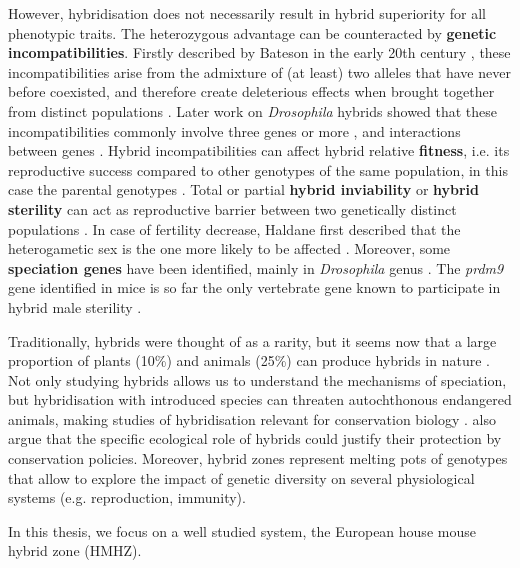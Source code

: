 However, hybridisation does not necessarily result in hybrid superiority for all phenotypic traits. The heterozygous advantage can be counteracted by \textbf{genetic incompatibilities}. Firstly described by Bateson in the early 20th century \citep{bateson_heredity_1909}, these incompatibilities arise from the admixture of (at least) two alleles that have never before coexisted, and therefore create deleterious effects when brought together from distinct populations \citep{dobzhansky_studies_1936, muller_isolating_1942, orr_population_1995}. Later work on \textit{Drosophila} hybrids showed that these incompatibilities commonly involve three genes or more \citep{cabot_genetics_1994, palopoli_genetics_1994}, and interactions between genes \parencite[\textbf{negative epistasis};][]{larson_evolution_2018}. Hybrid incompatibilities can affect hybrid relative \textbf{fitness}, i.e. its reproductive success compared to other genotypes of the same population, in this case the parental genotypes \citep{krimbas_fitness_2001}. Total or partial \textbf{hybrid inviability} or \textbf{hybrid sterility} can act as reproductive barrier between two genetically distinct populations \citep{coyne_reproductive_2001}. In case of fertility decrease, Haldane first described that the heterogametic sex is the one more likely to be affected \citep{haldane_sex_1922}. Moreover, some \textbf{speciation genes} \parencite[genes underlying reproductive isolation;][]{wu_genes_2004} have been identified, mainly in \textit{Drosophila} genus \citep{oliver_accelerated_2009}. The \textit{prdm9} gene identified in mice is so far the only vertebrate gene known to participate in hybrid male sterility \citep{mihola_mouse_2009}. 
\par
Traditionally, hybrids were thought of as a rarity, but it seems now that a large proportion of plants (10\%) and animals (25\%) can produce hybrids in nature \citep{mallet_hybridization_2005}. Not only studying hybrids allows us to understand the mechanisms of speciation, but hybridisation with introduced species can threaten autochthonous endangered animals, making studies of hybridisation relevant for conservation biology \citep{simberloff_hybridization_1996}. \cite{stronen_perspectives_2013} also argue that the specific ecological role of hybrids could justify their protection by conservation policies. Moreover, hybrid zones represent melting pots of genotypes that allow to explore the impact of genetic diversity on several physiological systems (e.g. reproduction, immunity).
\par
In this thesis, we focus on a well studied system, the European house mouse hybrid zone (HMHZ).

